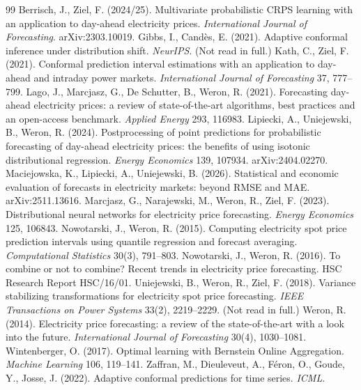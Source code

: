 \documentclass[11pt,a4paper]{article}
\begin{document}
\begin{thebibliography}{99}\small
{} Berrisch, J., Ziel, F. (2024/25). Multivariate probabilistic CRPS learning with an application to day-ahead electricity prices. \emph{International Journal of Forecasting}. arXiv:2303.10019.
 Gibbs, I., Cand\`es, E. (2021). Adaptive conformal inference under distribution shift. \emph{NeurIPS}. (Not read in full.)
 Kath, C., Ziel, F. (2021). Conformal prediction interval estimations with an application to day-ahead and intraday power markets. \emph{International Journal of Forecasting} 37, 777--799.
 Lago, J., Marcjasz, G., De Schutter, B., Weron, R. (2021). Forecasting day-ahead electricity prices: a review of state-of-the-art algorithms, best practices and an open-access benchmark. \emph{Applied Energy} 293, 116983.
 Lipiecki, A., Uniejewski, B., Weron, R. (2024). Postprocessing of point predictions for probabilistic forecasting of day-ahead electricity prices: the benefits of using isotonic distributional regression. \emph{Energy Economics} 139, 107934. arXiv:2404.02270.
 Maciejowska, K., Lipiecki, A., Uniejewski, B. (2026). Statistical and economic evaluation of forecasts in electricity markets: beyond RMSE and MAE. arXiv:2511.13616.
 Marcjasz, G., Narajewski, M., Weron, R., Ziel, F. (2023). Distributional neural networks for electricity price forecasting. \emph{Energy Economics} 125, 106843.
 Nowotarski, J., Weron, R. (2015). Computing electricity spot price prediction intervals using quantile regression and forecast averaging. \emph{Computational Statistics} 30(3), 791--803.
 Nowotarski, J., Weron, R. (2016). To combine or not to combine? Recent trends in electricity price forecasting. HSC Research Report HSC/16/01.
 Uniejewski, B., Weron, R., Ziel, F. (2018). Variance stabilizing transformations for electricity spot price forecasting. \emph{IEEE Transactions on Power Systems} 33(2), 2219--2229. (Not read in full.)
 Weron, R. (2014). Electricity price forecasting: a review of the state-of-the-art with a look into the future. \emph{International Journal of Forecasting} 30(4), 1030--1081.
 Wintenberger, O. (2017). Optimal learning with Bernstein Online Aggregation. \emph{Machine Learning} 106, 119--141.
 Zaffran, M., Dieuleveut, A., F\'eron, O., Goude, Y., Josse, J. (2022). Adaptive conformal predictions for time series. \emph{ICML}.
\end{thebibliography}
\end{document}
